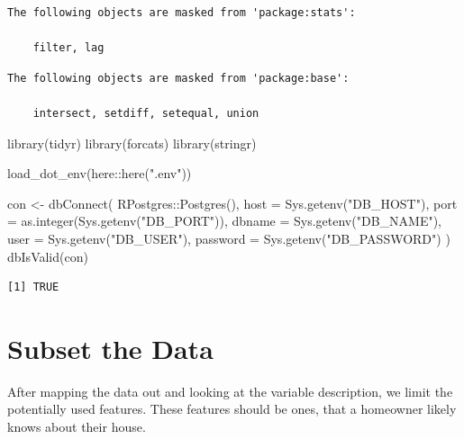 \documentclass[
  english,
  letterpaper,
  DIV=11,
  numbers=noendperiod]{scrreprt}
\newenvironment{Shaded}{\begin{snugshade}}{\end{snugshade}}
\newcommand{\AttributeTok}[1]{\textcolor[rgb]{0.40,0.45,0.13}{#1}}
\newcommand{\FunctionTok}[1]{\textcolor[rgb]{0.28,0.35,0.67}{#1}}
\newcommand{\NormalTok}[1]{\textcolor[rgb]{0.00,0.23,0.31}{#1}}
\newcommand{\OtherTok}[1]{\textcolor[rgb]{0.00,0.23,0.31}{#1}}
\newcommand{\SpecialCharTok}[1]{\textcolor[rgb]{0.37,0.37,0.37}{#1}}
\newcommand{\StringTok}[1]{\textcolor[rgb]{0.13,0.47,0.30}{#1}}
\begin{document}
\begin{verbatim}
The following objects are masked from 'package:stats':

    filter, lag
\end{verbatim}

\begin{verbatim}
The following objects are masked from 'package:base':

    intersect, setdiff, setequal, union
\end{verbatim}

\begin{Shaded}
\begin{Highlighting}[]
\FunctionTok{library}\NormalTok{(tidyr)}
\FunctionTok{library}\NormalTok{(forcats)}
\FunctionTok{library}\NormalTok{(stringr)}

\FunctionTok{load\_dot\_env}\NormalTok{(here}\SpecialCharTok{::}\FunctionTok{here}\NormalTok{(}\StringTok{".env"}\NormalTok{))}
\end{Highlighting}
\end{Shaded}

\begin{Shaded}
\begin{Highlighting}[]
\NormalTok{con }\OtherTok{\textless{}{-}} \FunctionTok{dbConnect}\NormalTok{(}
\NormalTok{  RPostgres}\SpecialCharTok{::}\FunctionTok{Postgres}\NormalTok{(),}
  \AttributeTok{host     =} \FunctionTok{Sys.getenv}\NormalTok{(}\StringTok{"DB\_HOST"}\NormalTok{),}
  \AttributeTok{port     =} \FunctionTok{as.integer}\NormalTok{(}\FunctionTok{Sys.getenv}\NormalTok{(}\StringTok{"DB\_PORT"}\NormalTok{)),}
  \AttributeTok{dbname   =} \FunctionTok{Sys.getenv}\NormalTok{(}\StringTok{"DB\_NAME"}\NormalTok{),}
  \AttributeTok{user     =} \FunctionTok{Sys.getenv}\NormalTok{(}\StringTok{"DB\_USER"}\NormalTok{),}
  \AttributeTok{password =} \FunctionTok{Sys.getenv}\NormalTok{(}\StringTok{"DB\_PASSWORD"}\NormalTok{)}
\NormalTok{)}
\FunctionTok{dbIsValid}\NormalTok{(con)}
\end{Highlighting}
\end{Shaded}

\begin{verbatim}
[1] TRUE
\end{verbatim}

\section{Subset the Data}\label{subset-the-data}

After mapping the data out and looking at the variable description, we
limit the potentially used features. These features should be ones, that
a homeowner likely knows about their house.
\end{document}
